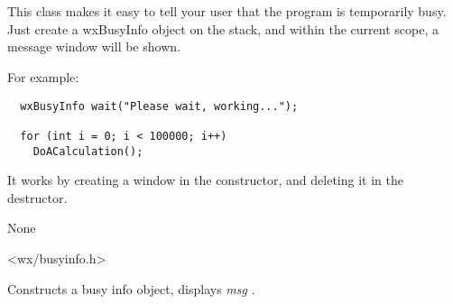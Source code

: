 \section{}\label{wxbusyinfo}

This class makes it easy to tell your user that the program is temporarily busy.
Just create a wxBusyInfo object on the stack, and within the current scope,
a message window will be shown.

For example:

\begin{verbatim}
  wxBusyInfo wait("Please wait, working...");

  for (int i = 0; i < 100000; i++)
    DoACalculation();
\end{verbatim}

It works by creating a window in the constructor,
and deleting it in the destructor.


None


<wx/busyinfo.h>




Constructs a busy info object, displays {\it msg} .


